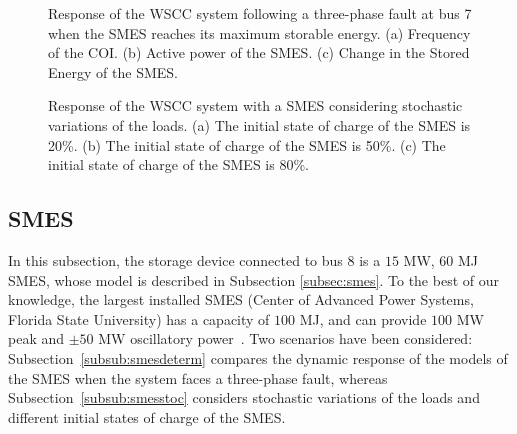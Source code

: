 \documentclass[journal, a4paper]{IEEEtran}
\begin{document}
\begin{figure}[t!]
  \centering
  \vspace{-2.5mm}
  \caption{Response of the WSCC system following a three-phase fault at
    bus 7 when the SMES reaches its maximum storable energy. (a)
    Frequency of the COI. (b) Active power of the SMES. 
    (c) Change in the Stored Energy of the SMES.}
  \label{SMES_Sat}
\vspace{-0.4cm}
\end{figure}
\newpage
\begin{figure*}[t!]
  \centering
  \caption{Response  of  the  WSCC  system  with  a  SMES  considering
    stochastic variations of the loads.
    (a) The initial state of charge of the SMES is 20\%.
    (b) The initial state of charge of the SMES is 50\%.
    (c) The initial state of charge of the SMES is 80\%.}
  \label{SMES_Stoc}
\vspace{-0.4cm}
\end{figure*}

\subsection{SMES}
\label{subsec:smesTDS}

In this subsection, the storage device connected to bus 8 is a $15$
MW, $60$ MJ SMES, whose model is described in Subsection
\ref{subsec:smes}.  To the best of our knowledge, the largest
  installed SMES (Center of Advanced Power Systems, Florida State
  University) has a capacity of $100$ MJ, and can provide $100$ MW
  peak and $\pm50$ MW oscillatory power~\cite{luongo:03}. 
Two scenarios have been considered: Subsection~\ref{subsub:smesdeterm}
compares the dynamic response of the models of the SMES when the system faces a 
three-phase fault, whereas Subsection~\ref{subsub:smesstoc} considers
stochastic variations of the loads and different initial states of charge of the SMES.
\end{document}
